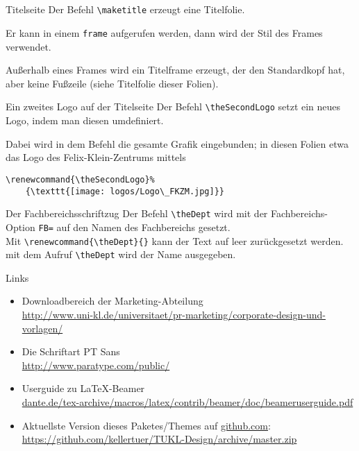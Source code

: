 \documentclass[german,10pt,xcolor=colortbl,compress
]{beamer}
\renewcommand{\theSecondLogo}{\texttt{[image: logos/Logo\_FKZM\_rgb.jpg]}}
\begin{document}
\subsection*{}
\begin{frame}[fragile]{Titelseite}
	Der Befehl \lstinline|\maketitle| erzeugt eine Titelfolie.

	Er kann in einem \lstinline|frame| aufgerufen werden, dann wird der Stil des Frames verwendet.

	Außerhalb eines Frames wird ein Titelframe erzeugt, der den Standardkopf hat, aber keine Fußzeile (siehe Titelfolie dieser Folien).
\end{frame}
\begin{frame}[fragile]{Ein zweites Logo auf der Titelseite}
	Der Befehl \lstinline|\theSecondLogo| setzt ein neues Logo, indem man diesen umdefiniert.

	Dabei wird in dem Befehl die gesamte Grafik eingebunden; in diesen Folien etwa das Logo des Felix-Klein-Zentrums mittels

	\begin{lstlisting}
\renewcommand{\theSecondLogo}%
	{\texttt{[image: logos/Logo\_FKZM.jpg]}}
		\end{lstlisting}
\end{frame}
\begin{frame}[fragile]{Der Fachbereichsschriftzug}
	Der Befehl \lstinline|\theDept| wird mit der Fachbereichs-Option \lstinline|FB=| auf den Namen des Fachbereichs gesetzt.
	\\[\baselineskip]
	Mit \lstinline|\renewcommand{\theDept}{}| kann der Text auf leer zurückgesetzt werden.
	mit dem Aufruf \lstinline!\theDept! wird der Name ausgegeben.
\end{frame}
\begin{frame}{Links}
	\begin{itemize}
		\item Downloadbereich der Marketing-Abteilung\\ \href{http://www.uni-kl.de/universitaet/pr-marketing/corporate-design-und-vorlagen/}{http://www.uni-kl.de/universitaet/pr-marketing/corporate-design-und-vorlagen/}
		\item Die Schriftart PT Sans\\
		      \href{http://www.paratype.com/public/}{http://www.paratype.com/public/}
		\item Userguide zu \LaTeX-Beamer\\ \href{ftp://ftp.dante.de/tex-archive/macros/latex/contrib/beamer/doc/beameruserguide.pdf}{dante.de/tex-archive/macros/latex/contrib/beamer/doc/beameruserguide.pdf}
		\item Aktuellste Version dieses Paketes/Themes auf \href{http://github.com}{github.com}:\\
		      \href{https://github.com/kellertuer/TUKL-Design/archive/master.zip}{https://github.com/kellertuer/TUKL-Design/archive/master.zip}
	\end{itemize}
\end{frame}
\end{document}
